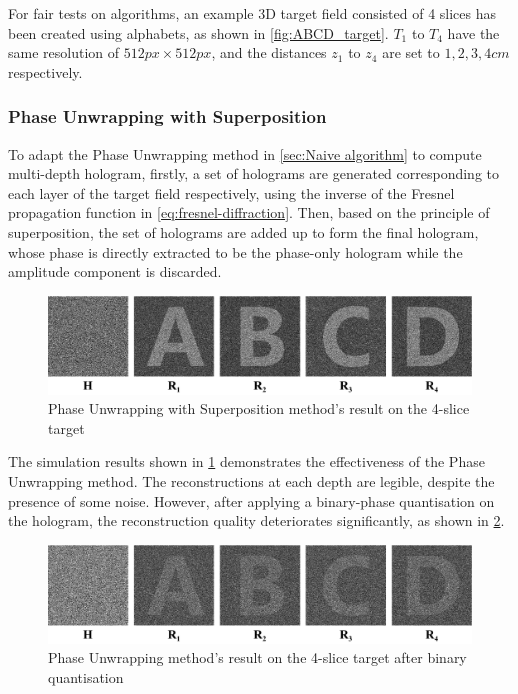 For fair tests on algorithms, an example 3D target field consisted of 4 slices has been created using alphabets, as shown in \cref{fig:ABCD_target}. $T_1$ to $T_4$ have the same resolution of $512px \times 512px$, and the distances $z_1$ to $z_4$ are set to $1, 2, 3, 4 cm$ respectively.


\subsubsection{Phase Unwrapping with Superposition}
To adapt the Phase Unwrapping method in \cref{sec:Naive algorithm} to compute multi-depth hologram, firstly, a set of holograms are generated corresponding to each layer of the target field respectively, using the inverse of the Fresnel propagation function in \cref{eq:fresnel-diffraction}. Then, based on the principle of superposition, the set of holograms are added up to form the final hologram, whose phase is directly extracted to be the phase-only hologram while the amplitude component is discarded.

\begin{figure}[H]
	\centering
	\includegraphics[width=1.0\textwidth]{ABCD/Naive_ABCD.pdf}
	\caption{Phase Unwrapping with Superposition method's result on the 4-slice target}
	\label{fig:Naive_ABCD}
\end{figure}

The simulation results shown in \cref{fig:Naive_ABCD} demonstrates the effectiveness of the Phase Unwrapping method. The reconstructions at each depth are legible, despite the presence of some noise. However, after applying a binary-phase quantisation on the hologram, the reconstruction quality deteriorates significantly, as shown in \cref{fig:Naive_ABCD_binary}.

\begin{figure}[H]
	\centering
	\includegraphics[width=1.0\textwidth]{ABCD/Naive_ABCD_binary.pdf}
	\caption{Phase Unwrapping method's result on the 4-slice target after binary quantisation}
	\label{fig:Naive_ABCD_binary}
\end{figure}

